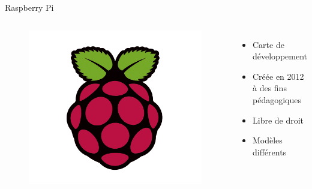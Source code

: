 \documentclass[aspectratio=169,xcolor=dvipsnames]{beamer}
\begin{document}
\begin{frame}{Raspberry Pi}
    \begin{columns}[c] %

        \begin{figure}
            \includegraphics[width=1\textwidth]{1/logo-rpi.png}
        \end{figure}

        \begin{itemize}
            \item Carte de développement
            \item Créée en 2012 à des fins pédagogiques
            \item Libre de droit
            \item Modèles différents
        \end{itemize}

    \end{columns}
\end{frame}

\end{document}
